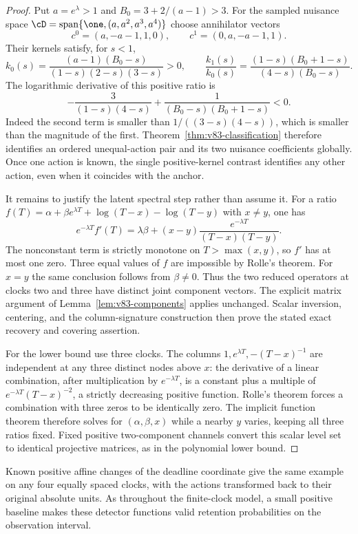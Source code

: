 \begin{proof}
Put $a=e^\lambda>1$ and $B_0=3+2/(a-1)>3$. For the sampled
nuisance space $\cD=\operatorname{span}\{\one,(a,a^2,a^3,a^4)\}$
choose annihilator vectors
\[
 c^0=(a,-a-1,1,0),\qquad c^1=(0,a,-a-1,1).
\]
Their kernels satisfy, for $s<1$,
\[
 k_0(s)=\frac{(a-1)(B_0-s)}{(1-s)(2-s)(3-s)}>0,\qquad
 \frac{k_1(s)}{k_0(s)}
   =\frac{(1-s)(B_0+1-s)}{(4-s)(B_0-s)}.
\]
The logarithmic derivative of this positive ratio is
\[
 -\frac{3}{(1-s)(4-s)}+
       \frac1{(B_0-s)(B_0+1-s)}<0.
\]
Indeed the second term is smaller than
$1/((3-s)(4-s))$, which is smaller than the magnitude of the first.
Theorem~\ref{thm:v83-classification} therefore identifies an ordered
unequal-action pair and its two nuisance coefficients globally.
Once one action is known, the single positive-kernel contrast identifies
any other action, even when it coincides with the anchor.

It remains to justify the latent spectral step rather than assume it.
For a ratio $f(T)=\alpha+\beta e^{\lambda T}
+\log(T-x)-\log(T-y)$ with $x\ne y$, one has
\[
 e^{-\lambda T}f'(T)=\lambda\beta+
          (x-y)\frac{e^{-\lambda T}}{(T-x)(T-y)}.
\]
The nonconstant term is strictly monotone on $T>\max(x,y)$, so
$f'$ has at most one zero. Three equal values of $f$ are impossible
by Rolle's theorem. For $x=y$ the same conclusion follows from
$\beta\ne0$. Thus the two reduced operators at clocks two and three
have distinct joint component vectors. The explicit matrix argument
of Lemma~\ref{lem:v83-components} applies unchanged. Scalar inversion,
centering, and the column-signature construction then prove the stated
exact recovery and covering assertion.

For the lower bound use three clocks. The columns
$1,e^{\lambda T},-(T-x)^{-1}$ are independent at any three distinct
nodes above $x$: the derivative of a linear combination, after
multiplication by $e^{-\lambda T}$, is a constant plus a multiple of
$e^{-\lambda T}(T-x)^{-2}$, a strictly decreasing positive function.
Rolle's theorem forces a combination with three zeros to be identically
zero. The implicit function theorem therefore solves for
$(\alpha,\beta,x)$ while a nearby $y$ varies, keeping all three ratios
fixed. Fixed positive two-component channels convert this scalar level
set to identical projective matrices, as in the polynomial lower bound.
\end{proof}

Known positive affine changes of the deadline coordinate give the same
example on any four equally spaced clocks, with the actions transformed
back to their original absolute units. As throughout the finite-clock
model, a small positive baseline makes these detector functions valid
retention probabilities on the observation interval.
